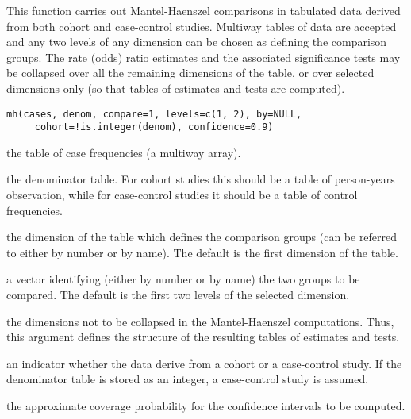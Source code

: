 \begin{Description}\relax
This function carries out Mantel-Haenszel comparisons in tabulated data 
derived from both cohort and case-control studies. Multiway tables of data
are accepted and any two levels of any dimension can be chosen as defining
the comparison groups. The rate (odds) ratio estimates and the associated
significance tests may be collapsed over all the remaining dimensions of the 
table, or over selected dimensions only (so that tables of estimates and 
tests are computed).
\end{Description}
\begin{Usage}
\begin{verbatim}
mh(cases, denom, compare=1, levels=c(1, 2), by=NULL,
     cohort=!is.integer(denom), confidence=0.9)
\end{verbatim}
\end{Usage}
\begin{Arguments}
\begin{ldescription}
\item[\code{cases}] the table of case frequencies (a multiway array).

\item[\code{denom}] the denominator table. For cohort studies this should be a table of 
person-years observation, while for case-control studies it should be a 
table of control frequencies. 

\item[\code{compare}] the dimension of the table which defines the comparison groups (can be 
referred to either by number or by name). The default is the first 
dimension of the table.

\item[\code{levels}] a vector identifying (either by number or by name) the two groups to be 
compared. The default is the first two levels of the selected dimension.

\item[\code{by}] the dimensions not to be collapsed in the Mantel-Haenszel computations. 
Thus, this argument defines the structure of the resulting tables of
estimates and tests.  

\item[\code{cohort}] an indicator  whether the data derive from a cohort or a case-control 
study. If the denominator table is stored as an integer, a case-control
study is assumed.

\item[\code{confidence}] the approximate coverage probability for the confidence intervals to be 
computed.

\end{ldescription}
\end{Arguments}
